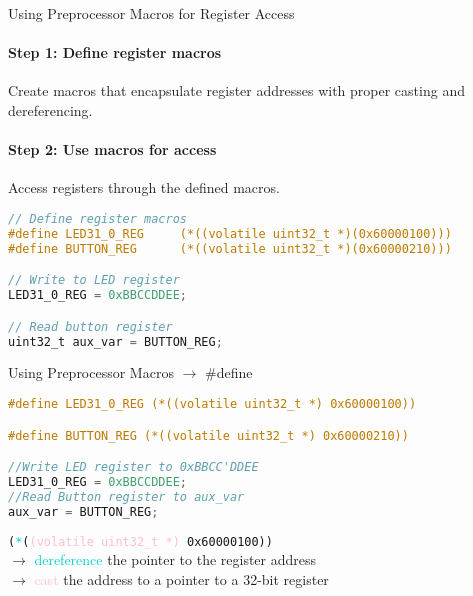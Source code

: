 \begin{KR}{Using Preprocessor Macros for Register Access}
\paragraph{Step 1: Define register macros}
Create macros that encapsulate register addresses with proper casting and dereferencing.
\paragraph{Step 2: Use macros for access}
Access registers through the defined macros.

\begin{lstlisting}[language=C, style=basesmol]
// Define register macros
#define LED31_0_REG     (*((volatile uint32_t *)(0x60000100)))
#define BUTTON_REG      (*((volatile uint32_t *)(0x60000210)))

// Write to LED register
LED31_0_REG = 0xBBCCDDEE;

// Read button register
uint32_t aux_var = BUTTON_REG;
\end{lstlisting}
\end{KR}

\begin{examplecode}{Using Preprocessor Macros} $\rightarrow$ \#define
\begin{lstlisting}[language=C, style=basesmol]
#define LED31_0_REG (*((volatile uint32_t *) 0x60000100))

#define BUTTON_REG (*((volatile uint32_t *) 0x60000210))

//Write LED register to 0xBBCC'DDEE
LED31_0_REG = 0xBBCCDDEE;
//Read Button register to aux_var
aux_var = BUTTON_REG;
\end{lstlisting}
    \vspace{2mm}
    \texttt{(\textcolor{darkturquoise}{*}(\textcolor{pink}{(volatile\ uint32\_t *)} 0x60000100))}\\
    $\rightarrow$ \textcolor{darkturquoise}{dereference} the pointer to the register address\\
    $\rightarrow$ \textcolor{pink}{cast} the address to a pointer to a 32-bit register
\end{examplecode}




